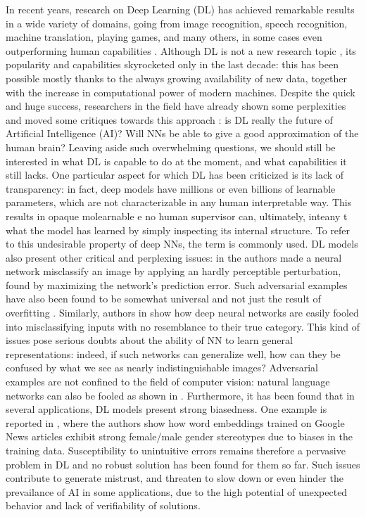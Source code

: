 In recent years, research on Deep Learning (DL) has achieved remarkable results in a wide variety of domains, going from image recognition, speech recognition, machine translation, playing games, and many others, 
	in some cases even outperforming human capabilities \cite{jumper2021highly, gebru2017using, schrittwieser2020mastering}. 
Although DL is not a new research topic \cite{lecun1989digits,rosenblatt1958perceptron}, its popularity and capabilities skyrocketed only in the last decade: this has been possible mostly thanks to the always growing availability of new data, together with the increase in computational power of modern machines.
Despite the quick and huge success, researchers in the field have already shown some perplexities and moved some critiques towards this approach \cite{marcus2018appraisal,sabour2017dynamic}: is DL really the future of Artificial Intelligence (AI)? Will NNs be able to give a good approximation of the human brain? Leaving aside such overwhelming questions, we should still be interested in what DL is capable to do at the moment, and what capabilities it still lacks.
One particular aspect for which DL has been criticized is its lack of transparency: in fact, deep models have millions or even billions of learnable parameters, which are not characterizable in any human interpretable way. This results in opaque molearnable e no human supervisor can, ultimately, inteany t what the model has learned by simply inspecting its internal structure. To refer to this undesirable property of deep NNs, the term  is commonly used. DL models also present other critical and perplexing issues: in \cite{szegedy2013intriguing} the authors made a neural network misclassify an image by applying an hardly perceptible perturbation, found by maximizing the network’s prediction error. Such adversarial examples have also been found to be somewhat universal and not just the result of overfitting \cite{buckner2020adversarial}. Similarly, authors in \cite{nguyen2015fooled} show how deep neural networks are easily fooled into misclassifying inputs with no resemblance to their true category. This kind of issues pose serious doubts about the ability of NN to learn general representations: indeed, if such networks can generalize well, how can they be confused by what we see as nearly indistinguishable images?  Adversarial examples are not confined to the field of computer vision: natural language networks can also be fooled as shown in \cite{jia2017adversarial,zhang2019generating}. Furthermore, it has been found that in several applications, DL models present strong biasedness. One example is reported in \cite{bolukbasi2016debiasing}, where the authors show how word embeddings trained on Google News articles exhibit strong female/male gender stereotypes due to biases in the training data. Susceptibility to unintuitive errors remains therefore a pervasive problem in DL and no robust solution has been found for them so far. Such issues contribute to generate mistrust, and threaten to slow down or even hinder the prevailance of AI in some applications, due to the high potential of unexpected behavior and lack of verifiability of solutions.
